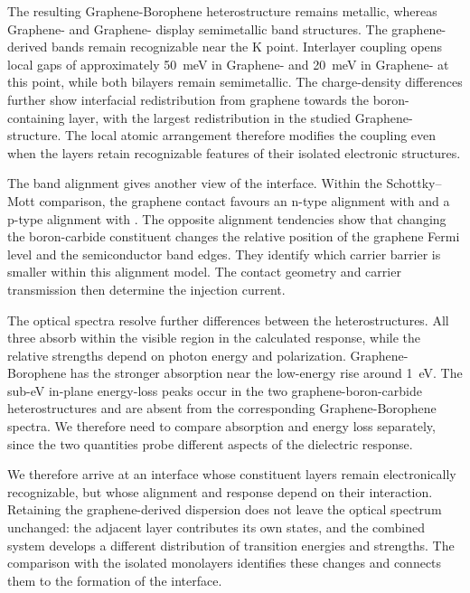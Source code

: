 The resulting Graphene-Borophene heterostructure remains metallic, whereas Graphene- and Graphene- display semimetallic band structures.
The graphene-derived bands remain recognizable near the $\mathrm{K}$ point.
Interlayer coupling opens local gaps of approximately \qty{50}{\milli\electronvolt} in Graphene- and \qty{20}{\milli\electronvolt} in Graphene- at this point, while both bilayers remain semimetallic.
The charge-density differences further show interfacial redistribution from graphene towards the boron-containing layer, with the largest redistribution in the studied Graphene- structure.
The local atomic arrangement therefore modifies the coupling even when the layers retain recognizable features of their isolated electronic structures.

The band alignment gives another view of the interface.
Within the Schottky--Mott comparison, the graphene contact favours an n-type alignment with  and a p-type alignment with .
The opposite alignment tendencies show that changing the boron-carbide constituent changes the relative position of the graphene Fermi level and the semiconductor band edges.
They identify which carrier barrier is smaller within this alignment model.
The contact geometry and carrier transmission then determine the injection current.

The optical spectra resolve further differences between the heterostructures.
All three absorb within the visible region in the calculated response, while the relative strengths depend on photon energy and polarization.
Graphene-Borophene has the stronger absorption near the low-energy rise around \qty{1}{\electronvolt}.
The sub-\unit{\electronvolt} in-plane energy-loss peaks occur in the two graphene-boron-carbide heterostructures and are absent from the corresponding Graphene-Borophene spectra.
We therefore need to compare absorption and energy loss separately, since the two quantities probe different aspects of the dielectric response.

We therefore arrive at an interface whose constituent layers remain electronically recognizable, but whose alignment and response depend on their interaction.
Retaining the graphene-derived dispersion does not leave the optical spectrum unchanged: the adjacent layer contributes its own states, and the combined system develops a different distribution of transition energies and strengths.
The comparison with the isolated monolayers identifies these changes and connects them to the formation of the interface.

